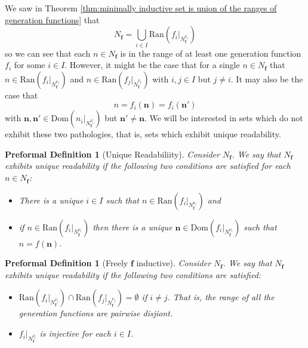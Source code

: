 \documentclass[oneside, 12pt]{book}
\theoremstyle{break}
\newtheorem{preformal definition}[definition]{Preformal Definition}
\newtheorem{preformal theorem}[theorem]{Preformal Theorem}
\newcommand{\bv}[1]{\boldsymbol{#1}}
\begin{document}
				We saw in Theorem \ref{thm:minimally inductive set is union of the ranges of generation functions} that
				\begin{equation*}
					N_{\bv{f}} = \bigcup_{i\in I} \text{Ran}\left(f_i|_{N_{\bv{f}}^{\nu_i}}\right)
				\end{equation*}
				so we can see that each $n\in N_{\bv{f}}$ is in the range of at least one generation function $f_i$ for some $i\in I$.
				However, it might be the case that for a single $n\in N_{\bv{f}}$ that $n \in \text{Ran}\left(f_i|_{N_{\bv{f}}^{\nu_i}}\right)$ and $n \in \text{Ran}\left(f_j|_{N_{\bv{f}}^{\nu_j}}\right)$ with $i, j \in I$ but $j \neq i$.
				It may also be the case that
				\begin{equation*}
					n = f_i(\bv{n}) = f_i(\bv{n}')
				\end{equation*}
				with $\bv{n}, \bv{n}' \in \text{Dom}\left(n_i|_{N_{\bv{f}}^{\nu_i}}\right)$ but $\bv{n}' \neq \bv{n}$.
				We will be interested in sets which do not exhibit these two pathologies, that is, sets which exhibit unique readability.
				\begin{preformal definition}[Unique Readabiliity]
					Consider $N_{\bv{f}}$. 
					We say that $N_{\bv{f}}$ exhibits unique readability if the following two conditions are satisfied for each $n\in N_{\bv{f}}$:
					\begin{itemize}
						\item{There is a unique $i\in I$ such that $n\in \text{Ran}\left(f_i|_{N_{\bv{f}}^{\nu_i}}\right)$ and}
						\item{if $n \in \text{Ran}\left(f_i|_{N_{\bv{f}}^{\nu_i}}\right)$ then there is a unique $\bv{n} \in \text{Dom}\left(f_i|_{N_{\bv{f}}^{\nu_i}}\right)$ such that $n = f(\bv{n})$.}
					\end{itemize}
				\end{preformal definition}
				
				\begin{preformal definition}[Freely $\bv{f}$ inductive]
					Consider $N_{\bv{f}}$.
					We say that $N_{\bv{f}}$ exhibits unique readability if the following two conditions are satisfied:
					\begin{itemize}
						\item{$\text{Ran}\left(f_i|_{N_{\bv{f}}^{\nu_i}}\right) \cap \text{Ran}\left(f_j|_{N_{\bv{f}}^{\nu_j}}\right) = \emptyset$ if $i\neq j$. That is, the range of all the generation functions are pairwise disjiont.}
						\item{$f_i|_{N_{\bv{f}}^{\nu_i}}$ is injective for each $i\in I$.}
					\end{itemize}
				\end{preformal definition}
				
\end{document}
